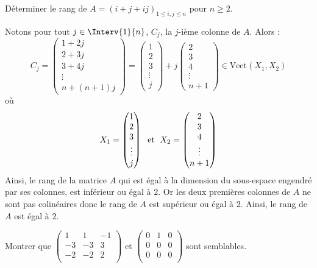 \documentclass[a4paper,10pt]{report}
\begin{document}
\begin{Exa} Déterminer le rang de $A=(i+j+ij)_{1\leq i,j\leq n}$ pour $n \geq 2$.
\end{Exa} 

\corr Notons pour tout $j \in \Interv{1}{n}$, $C_j$, la $j$-ième colonne de $A$. Alors :
$$ C_j = \begin{pmatrix}
1 + 2j \\
2 + 3j \\
3 + 4j \\
\vdots \\
n + (n+1)j
\end{pmatrix} = \begin{pmatrix}
1  \\
2  \\
3  \\
\vdots \\
 j
\end{pmatrix} + j \begin{pmatrix}
2 \\
3 \\
4\\
\vdots \\
n+1
\end{pmatrix} \in \textrm{Vect}(X_1,X_2)$$
où 
$$ X_1= \begin{pmatrix}
1  \\
2  \\
3  \\
\vdots \\
 j
\end{pmatrix} \; \hbox{ et } \; X_2 = \begin{pmatrix}
2 \\
3 \\
4\\
\vdots \\
n+1
\end{pmatrix}$$
Ainsi, le rang de la matrice $A$ qui est égal à la dimension du sous-espace engendré par ses colonnes, est inférieur ou égal à $2$. Or les deux premières colonnes de $A$ ne sont pas colinéaires donc le rang de $A$ est supérieur ou égal à $2$. Ainsi, le rang de $A$ est égal à $2$.

\begin{Exa} Montrer que $\begin{pmatrix}
1 & 1 & -1 \\
-3 & -3 & 3 \\
-2 & -2 & 2 \\
\end{pmatrix}$ et $\begin{pmatrix}
0 & 1 & 0 \\
0 & 0 & 0 \\
0 & 0 & 0 \\
\end{pmatrix}$ sont semblables.
\end{Exa}
\end{document}
